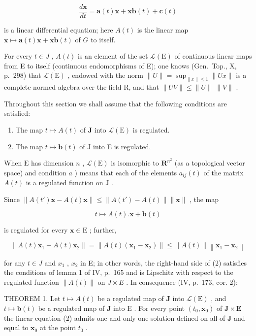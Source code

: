 \[
\frac {d \mathbf {x}}{d t} = \mathbf {a} (t) \mathbf {x} + \mathbf {x b} (t) + \mathbf {c} (t)
\]

is a linear differential equation; here \(A(t)\) is the linear map \(\mathbf{x} \mapsto \mathbf{a}(t)\mathbf{x} + \mathbf{x}\mathbf{b}(t)\) of \(G\) to itself.

For every \(t \in J\) , \(A(t)\) is an element of the set \(\mathcal{L}(\mathrm{E})\) of continuous linear maps from E to itself (continuous endomorphisms of E); one knows (Gen.~Top., X, p.~298) that \(\mathcal{L}(\mathrm{E})\) , endowed with the norm \(\|U\| = \sup_{\|x\| \leqslant 1} \|Ux\|\) is a complete normed algebra over the field R, and that \(\|UV\| \leqslant \|U\|\) \(\|V\|\) .

Throughout this section we shall assume that the following conditions are satisfied:

\begin{enumerate}
\def\labelenumi{\alph{enumi})}
\item
  The map \(t \mapsto A(t)\) of \(\mathbf{J}\) into \(\mathcal{L}(\mathrm{E})\) is regulated.
\item
  The map \(t \mapsto \mathbf{b}(t)\) of J into E is regulated.
\end{enumerate}

When \(\mathrm{E}\) has dimension \(n\) , \(\mathcal{L}(\mathrm{E})\) is isomorphic to \(\mathbf{R}^{n^2}\) (as a topological vector space) and condition \(a\) ) means that each of the elements \(a_{ij}(t)\) of the matrix \(A(t)\) is a regulated function on \(\mathrm{J}\) .

Since \(\left\| A(t')\mathbf{x} - A(t)\mathbf{x}\right\| \leqslant \left\| A(t') - A(t)\right\| \| \mathbf{x}\|\) , the map

\[
t \mapsto A (t). \mathbf {x} + \mathbf {b} (t)
\]

is regulated for every \(\mathbf{x} \in \mathrm{E}\) ; further,

\[
\left\| A (t) \mathbf {x} _ {1} - A (t) \mathbf {x} _ {2} \right\| = \left\| A (t) \left(\mathbf {x} _ {1} - \mathbf {x} _ {2}\right) \right\| \leqslant \left\| A (t) \right\| \left\| \mathbf {x} _ {1} - \mathbf {x} _ {2} \right\|
\]

for any \(t \in J\) and \(x_{1}\) , \(x_{2}\) in E; in other words, the right-hand side of (2) satisfies the conditions of lemma 1 of IV, p.~165 and is Lipschitz with respect to the regulated function \(\|A(t)\|\) on \(J \times E\) . In consequence (IV, p.~173, cor. 2):

THEOREM 1. Let \(t \mapsto A(t)\) be a regulated map of \(\mathbf{J}\) into \(\mathcal{L}(\mathrm{E})\) , and \(t \mapsto \mathbf{b}(t)\) be a regulated map of \(\mathbf{J}\) into \(\mathrm{E}\) . For every point \((t_0, \mathbf{x}_0)\) of \(\mathbf{J} \times \mathbf{E}\) the linear equation (2) admits one and only one solution defined on all of \(\mathbf{J}\) and equal to \(\mathbf{x}_0\) at the point \(t_0\) .

